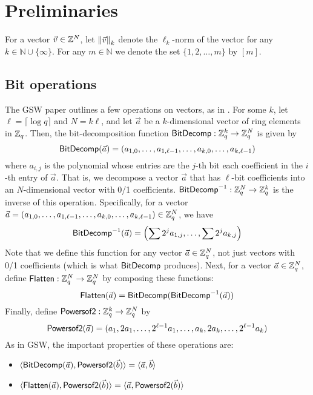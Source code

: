 \section{Preliminaries}\label{sec:prelim}

For a vector $\vec{v} \in \Z^N$, let $\norm{k}{\vec{v}}$ denote the $\ell_k$-norm of the vector for any $k \in \mathbb{N}\cup \{\infty\}$. For any $m \in \mathbb{N}$ we denote the set $\{1,2,\ldots,m\}$ by $[m]$.

\subsection{Bit operations}

The GSW paper outlines a few operations on vectors, as in \cite{shield}.  For some $k$, let $\ell = \lceil \log q \rceil$ and $N = k\ell$, and let $\vec{a}$ be a $k$-dimensional vector of ring elements in $\Zq$.  Then, the bit-decomposition function $\bdfn: \Zq^k \to \Zq^N$ is given by $$\bdfn(\vec{a}) = (a_{1,0}, \ldots, a_{1, \ell-1}, \ldots, a_{k, 0}, \ldots, a_{k, \ell-1})$$ where $a_{i,j}$ is the polynomial whose entries are the $j$-th bit each coefficient in the $i$-th entry of $\vec{a}$.  That is, we decompose a vector $\vec{a}$ that has $\ell$-bit coefficients into an $N$-dimensional vector with 0/1 coefficients.  $\bdifn: \Zq^N \to \Zq^k$ is the inverse of this operation.  Specifically, for a vector $\vec{a} = (a_{1,0}, \ldots, a_{1, \ell-1}, \ldots, a_{k, 0}, \ldots, a_{k, \ell-1}) \in \Zq^N$, we have $$\bdifn(\vec{a}) = \left(\sum 2^j a_{1,j}, \ldots, \sum 2^j a_{k, j}\right)$$  Note that we define this function for any vector $\vec{a} \in \Zq^N$, not just vectors with 0/1 coefficients (which is what $\bdfn$ produces).  Next, for a vector $\vec{a} \in \Zq^N$, define $\flattenfn: \Zq^N \to \Zq^N$ by composing these functions: $$\flattenfn(\vec{a}) = \bdfn(\bdifn(\vec{a}))$$  Finally, define $\powfn: \Zq^k \to \Zq^N$ by $$\powfn(\vec{a}) = (a_1, 2a_1, \ldots, 2^{\ell-1}a_1, \ldots, a_k, 2a_k, \ldots, 2^{\ell-1}a_k)$$  As in GSW, the important properties of these operations are:

\begin{itemize}
\item $\langle \bdfn(\vec{a}), \powfn(\vec{b}) \rangle = \langle \vec{a}, \vec{b} \rangle$
\item $\langle \flattenfn(\vec{a}), \powfn(\vec{b}) \rangle = \langle \vec{a}, \powfn(\vec{b}) \rangle$
\end{itemize}

